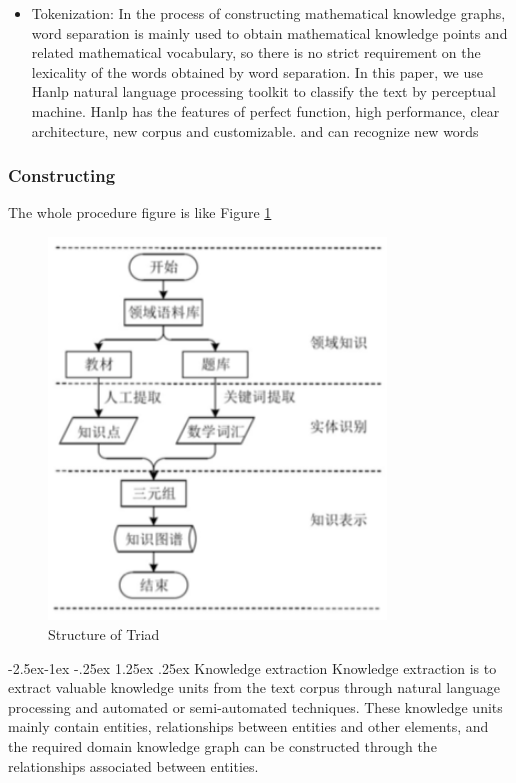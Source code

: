 \documentclass[11pt,en]{elegantpaper}
\makeatletter
\renewcommand\paragraph{\@startsection{paragraph}{4}{\z@}%
            {-2.5ex\@plus -1ex \@minus -.25ex}%
            {1.25ex \@plus .25ex}%
            {\normalfont\normalsize\bfseries}}
\makeatother
\begin{document}
\begin{itemize}
	\item Tokenization: In the process of constructing mathematical knowledge graphs, word separation is mainly used to obtain mathematical knowledge points and related mathematical vocabulary, so there is no strict requirement on the lexicality of the words obtained by word separation. In this paper, we use Hanlp natural language processing toolkit to classify the text by perceptual machine. Hanlp has the features of perfect function, high performance, clear architecture, new corpus and customizable. and can recognize new words
\end{itemize}


\subsubsection{Constructing}
The whole procedure figure is like Figure \ref{kg1}


\begin{figure}[h]
	\centering

	\includegraphics[width=0.8\textwidth]{./image/kg1.png}
	\caption{Structure of Triad}
	\label{kg1}
\end{figure}

\paragraph{Knowledge extraction}
Knowledge extraction is to extract valuable knowledge units from the text corpus through natural language processing and automated or semi-automated techniques. These knowledge units mainly contain entities, relationships between entities and other elements, and the required domain knowledge graph can be constructed through the relationships associated between entities.
\end{document}
